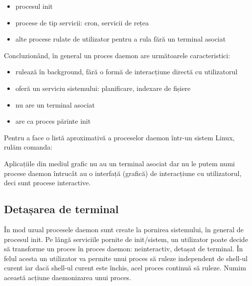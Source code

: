 \begin{itemize}
	\item procesul init
	\item procese de tip servicii: cron, servicii de rețea
	\item alte procese rulate de utilizator pentru a rula fără un terminal
		asociat
\end{itemize}

Concluzionând, în general un proces daemon are următoarele caracteristici:

\begin{itemize}
	\item rulează în background, fără o formă de interacțiune directă cu
		utilizatorul
	\item oferă un serviciu sistemului: planificare, indexare de fișiere
	\item nu are un terminal asociat
	\item are ca proces părinte init
\end{itemize}

Pentru a face o listă aproximativă a proceselor daemon într-un sistem Linux, rulăm comanda:


Aplicațiile din mediul grafic nu au un terminal asociat dar nu le putem numi
procese daemon întrucât au o interfață (grafică) de interacțiune cu
utilizatorul, deci sunt procese interactive.

\subsection{Detașarea de terminal}
\label{sec:procese-interactivitate-detasare}

În mod uzual procesele daemon sunt create la pornirea sistemului, în general de
procesul init. Pe lângă serviciile pornite de init/sistem, un utilizator poate
decide să transforme un proces în proces daemon: neinteractiv, detașat de
terminal. În felul acesta un utilizator va permite unui proces să ruleze
independent de shell-ul curent iar dacă shell-ul curent este închis, acel proces
continuă să ruleze. Numim această acțiune daemonizarea unui proces.

